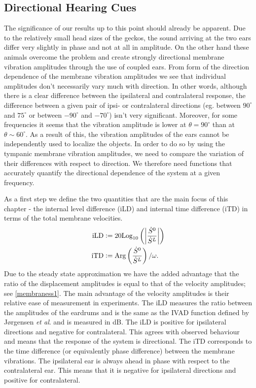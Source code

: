 \subsection{Directional Hearing Cues}\label{hearingcuessection}
The significance of our results up to this point should
already be apparent. Due to the relatively small head sizes of the geckos, the sound arriving at the two ears differ very slightly in phase and not at all in amplitude. On the other hand
 these animals overcome the problem and create strongly directional membrane vibration amplitudes through the use of coupled ears. From
 form of the direction dependence of the membrane vibration amplitudes we see that individual amplitudes don't necessarily vary much with direction. In other words, although
 there is a clear difference between the ipsilateral and contralateral response, the difference between a given pair of ipsi- or contralateral directions (eg. between $90^\circ$
 and $75^\circ$ or between $-90^\circ$ and $-70^\circ$) isn't very significant. Moreover, for some frequencies it seems that the vibration amplitude is lower at $\theta=90^\circ$ 
 than at $\theta\sim 60^\circ$.
 As a result of this, the vibration amplitudes of the ears cannot be independently used to localize the objects. In order to do so by using the tympanic membrane 
 vibration amplitudes, we need to compare the variation of their differences with respect to direction.
We therefore need functions that accurately quantify the directional dependence of the system at a given frequency. 

As a first step we define the two quantities that are the main focus of this chapter - the internal level difference (iLD) and internal time difference (iTD)
in terms of the total membrane velocities. 
\begin{align}
  \mbox{iLD}&\vcentcolon= 20\mbox{Log}_{10}\left(\left|\frac{\dot{S}^0}{\dot{S}^L}\right|\right)\label{iLDfirstdef}\\
  \mbox{iTD}&\vcentcolon= \mbox{Arg}\left(\frac{\dot{S}^0}{\dot{S}^L}\right)/\omega.\label{iTDfirstdef}
\end{align}
Due to the steady state approximation we have the added advantage that the ratio of the displacement amplitudes is equal
to that of the velocity amplitudes; see \eqref{membraness1}. The main advantage of the velocity amplitudes 
is their relative ease of measurement in experiments. The iLD measures the ratio between the amplitudes of the eardrums and is the same as the IVAD function defined by J\o{}rgensen \emph{et al}. \cite{jorgensenschmitz} and
is measured in dB. The iLD is positive for ipsilateral directions and negative for contralateral.
This agrees with observed behaviour and means that the response of the system is directional.  The iTD corresponds to the time
difference (or equivalently phase difference) between the membrane vibrations. The ipsilateral ear is always ahead in phase
with respect to the contralateral ear. This means that it is negative for ipsilateral directions and positive for contralateral.

